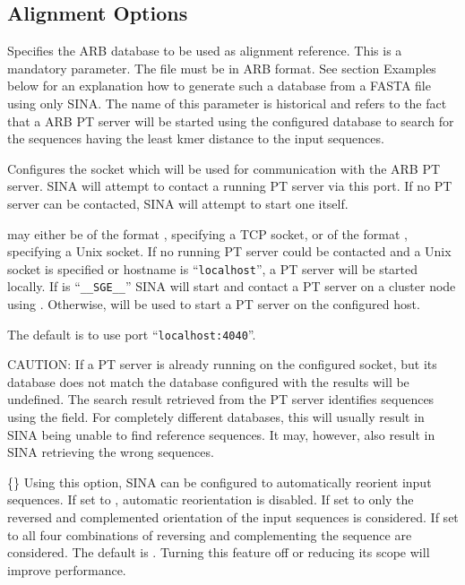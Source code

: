 \documentclass[english,a4paper]{article}
\begin{document}
\subsection{Alignment Options}
\begin{Description}
\item[\OptArg{-{}-ptdb }{filename}] 
Specifies the ARB database to be used as alignment reference. This is a mandatory
parameter. The file must be in ARB format. See section Examples below for an explanation how to generate such a
database from a FASTA file using only SINA. The name of this parameter is historical and refers to the
fact that a ARB PT server will be started using the configured database to search for the sequences having 
the least kmer distance to the input sequences.
\item[\OptArg{-{}-ptport }{socket}] 
Configures the socket which will be used for communication with the ARB PT server. SINA will attempt to 
contact a running PT server via this port. If no PT server can be contacted, SINA will attempt to start
one itself. 

 may either be of the format , specifying a TCP socket, or of the format
, specifying a Unix socket. If no running PT server could be contacted and a Unix socket 
is specified or hostname is ``\texttt{localhost}'', a PT server will be started locally. If  is ``\texttt{\_\_SGE\_\_}''
SINA will start and contact a PT server on a cluster node using . Otherwise,  
will be used to start a PT server on the configured host. 

The default is to use port ``\texttt{localhost:4040}''.

CAUTION: If a PT server is already running on the configured socket, but its database does not match the 
database configured with  the results will be undefined. The search result retrieved from 
the PT server identifies sequences using the  field. For completely different databases, this
will usually result in SINA being unable to find reference sequences. It may, however, also result
in SINA retrieving the wrong sequences. 
\item[\Opt{-{}-turn } \{\Arg{none}\Bar\Arg{revcomp}\Bar\Arg{all}\}]
Using this option, SINA can be configured to automatically reorient input sequences. If set to , 
automatic reorientation is disabled. If set to  only the reversed and complemented orientation
of the input sequences is considered. If set to  all four combinations of reversing and complementing
the sequence are considered. The default is . Turning this feature off or reducing its scope 
will improve performance.


\end{Description}
\end{document}
